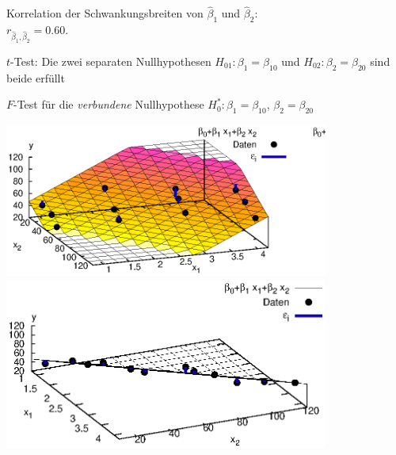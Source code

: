 \begin{landscape}
\begin{center}
\parbox{1.05\textwidth}{

\vspace{-1em}

\hspace{0.15\textwidth}
\parbox{0.8\textwidth}{{\small
Korrelation der Schwankungsbreiten von  $\hat{\beta}_1$ und 
$\hat{\beta}_2$:\\
 $r_{\hat{\beta}_1,\hat{\beta}_2}=0.60$.
}}}
\hspace{0em}
\parbox{0.30\textwidth}{
{\small
\bi
\item 
$t$-Test: Die zwei separaten Nullhypothesen $H_{01}: \beta_1=\beta_{10}$ 
und $H_{02}: \beta_2=\beta_{20}$ sind beide erf\"ullt \\[0em]
\item
$F$-Test f\"ur die \emph{verbundene} Nullhypothese 
$H^*_0: \beta_1=\beta_{10}$, 
$\beta_2=\beta_{20}$
\ei
}
}

\newpage
\vspace{1em}

\parbox{1.35\textwidth}{
\includegraphics[width=0.80\textwidth]{figsRegr/hotel_scatter3d_1.eps}
\hspace{-0.2\textwidth}
\includegraphics[width=0.80\textwidth]{figsRegr/hotel_scatter3d_2.eps}
\hspace{-0.1\textwidth}
}
\vspace{-0em}


\end{center}
\end{landscape}
